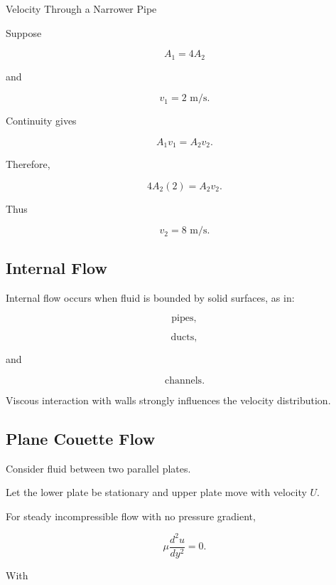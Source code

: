 \begin{workedexamplebox}{Velocity Through a Narrower Pipe}

Suppose

\[
A_1=4A_2
\]

and

\[
v_1=2\text{ m/s}.
\]

Continuity gives

\[
A_1v_1
=
A_2v_2.
\]

Therefore,

\[
4A_2(2)
=
A_2v_2.
\]

Thus

\begin{answerbox}
\[
\boxed{
v_2=8\text{ m/s}.
}
\]
\end{answerbox}

\end{workedexamplebox}

\subsection{Internal Flow}
\label{subsec:internal-flow}

Internal flow occurs when fluid is bounded by solid surfaces, as in:

\[
\boxed{
\text{pipes},
}
\]

\[
\boxed{
\text{ducts},
}
\]

and

\[
\boxed{
\text{channels}.
}
\]

Viscous interaction with walls strongly influences the velocity distribution.

\subsection{Plane Couette Flow}
\label{subsec:plane-couette-flow}

Consider fluid between two parallel plates.

Let the lower plate be stationary and upper plate move with velocity \(U\).

For steady incompressible flow with no pressure gradient,

\[
\boxed{
\mu\frac{d^2u}{dy^2}=0.
}
\]

With

